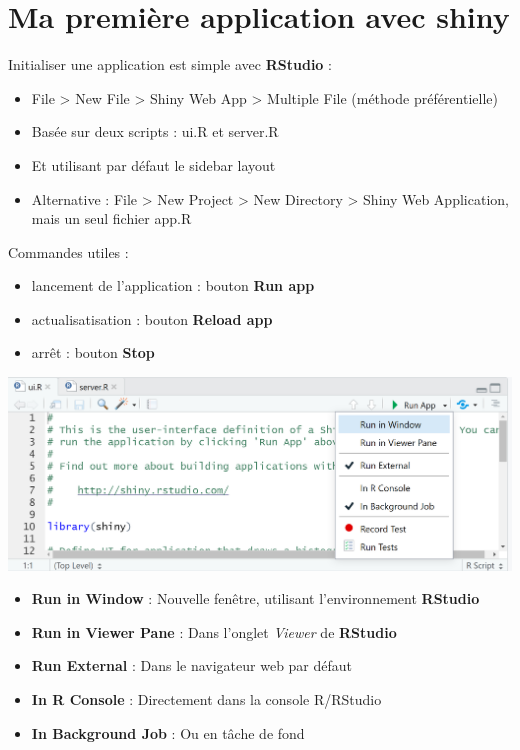 \documentclass[
]{article}
\providecommand{\tightlist}{%
  \setlength{\itemsep}{0pt}\setlength{\parskip}{0pt}}
\begin{document}
\hypertarget{ma-premiuxe8re-application-avec-shiny}{%
\section{Ma première application avec
shiny}\label{ma-premiuxe8re-application-avec-shiny}}

Initialiser une application est simple avec \textbf{RStudio} :

\begin{itemize}
\tightlist
\item
  File \textgreater{} New File \textgreater{} Shiny Web App
  \textgreater{} Multiple File (méthode préférentielle)
\item
  Basée sur deux scripts : ui.R et server.R
\item
  Et utilisant par défaut le sidebar layout
\item
  Alternative : File \textgreater{} New Project \textgreater{} New
  Directory \textgreater{} Shiny Web Application, mais un seul fichier
  app.R
\end{itemize}

Commandes utiles :

\begin{itemize}
\tightlist
\item
  lancement de l'application : bouton \textbf{Run app}
\item
  actualisatisation : bouton \textbf{Reload app}
\item
  arrêt : bouton \textbf{Stop}
\end{itemize}

\includegraphics{img/run_app.png}

\begin{itemize}
\tightlist
\item
  \textbf{Run in Window} : Nouvelle fenêtre, utilisant l'environnement
  \textbf{RStudio}
\item
  \textbf{Run in Viewer Pane} : Dans l'onglet \emph{Viewer} de
  \textbf{RStudio}
\item
  \textbf{Run External} : Dans le navigateur web par défaut
\item
  \textbf{In R Console} : Directement dans la console R/RStudio
\item
  \textbf{In Background Job} : Ou en tâche de fond
\end{itemize}
\end{document}
